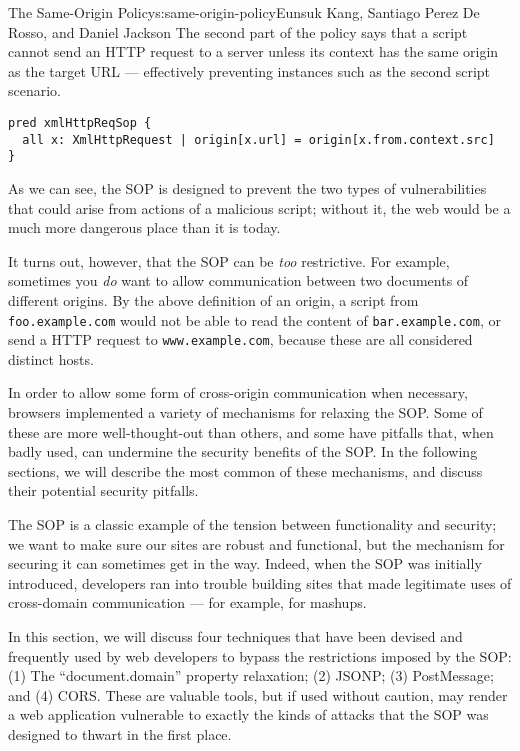 \begin{aosachapter}{The Same-Origin Policy}{s:same-origin-policy}{Eunsuk Kang, Santiago Perez De Rosso, and Daniel Jackson}
The second part of the policy says that a script cannot send an HTTP
request to a server unless its context has the same origin as the target
URL --- effectively preventing instances such as the second script
scenario.

\begin{verbatim}
pred xmlHttpReqSop { 
  all x: XmlHttpRequest | origin[x.url] = origin[x.from.context.src] 
}
\end{verbatim}

As we can see, the SOP is designed to prevent the two types of
vulnerabilities that could arise from actions of a malicious script;
without it, the web would be a much more dangerous place than it is
today.

It turns out, however, that the SOP can be \emph{too} restrictive. For
example, sometimes you \emph{do} want to allow communication between two
documents of different origins. By the above definition of an origin, a
script from \texttt{foo.example.com} would not be able to read the
content of \texttt{bar.example.com}, or send a HTTP request to
\texttt{www.example.com}, because these are all considered distinct
hosts.

In order to allow some form of cross-origin communication when
necessary, browsers implemented a variety of mechanisms for relaxing the
SOP. Some of these are more well-thought-out than others, and some have
pitfalls that, when badly used, can undermine the security benefits of
the SOP. In the following sections, we will describe the most common of
these mechanisms, and discuss their potential security pitfalls.

\label{techniques-for-bypassing-the-sop}

The SOP is a classic example of the tension between functionality and
security; we want to make sure our sites are robust and functional, but
the mechanism for securing it can sometimes get in the way. Indeed, when
the SOP was initially introduced, developers ran into trouble building
sites that made legitimate uses of cross-domain communication --- for
example, for mashups.

In this section, we will discuss four techniques that have been devised
and frequently used by web developers to bypass the restrictions imposed
by the SOP: (1) The ``document.domain'' property relaxation; (2) JSONP;
(3) PostMessage; and (4) CORS. These are valuable tools, but if used
without caution, may render a web application vulnerable to exactly the
kinds of attacks that the SOP was designed to thwart in the first place.


\end{aosachapter}
